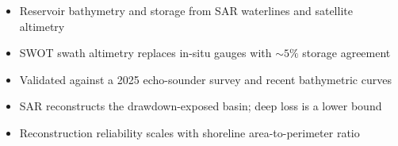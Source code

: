 \begin{itemize}
  \item Reservoir bathymetry and storage from SAR waterlines and satellite altimetry
  \item SWOT swath altimetry replaces in-situ gauges with ${\sim}5\%$ storage agreement
  \item Validated against a 2025 echo-sounder survey and recent bathymetric curves
  \item SAR reconstructs the drawdown-exposed basin; deep loss is a lower bound
  \item Reconstruction reliability scales with shoreline area-to-perimeter ratio
\end{itemize}
